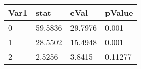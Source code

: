 \begin{tabular}{llll}
\toprule 
Var1 & stat & cVal & pValue \\ 
\midrule 
0 & 59.5836 & 29.7976 & 0.001 \\ 
1 & 28.5502 & 15.4948 & 0.001 \\ 
2 & 2.5256 & 3.8415 & 0.11277 \\ 
\bottomrule 
\end{tabular}